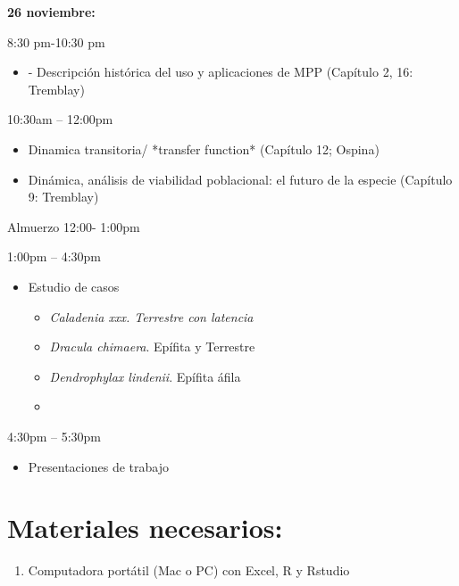 \documentclass[
]{book}
\providecommand{\tightlist}{%
  \setlength{\itemsep}{0pt}\setlength{\parskip}{0pt}}
\theoremstyle{definition}
\theoremstyle{definition}
\theoremstyle{definition}
\theoremstyle{definition}
\theoremstyle{remark}
\begin{document}
\textbf{26 noviembre:}

8:30 pm-10:30 pm

\begin{itemize}
\tightlist
\item
  - Descripción histórica del uso y aplicaciones de MPP (Capítulo 2,
  16: Tremblay)
\end{itemize}

10:30am -- 12:00pm

\begin{itemize}
\item
  Dinamica transitoria/ *transfer function* (Capítulo 12; Ospina)
\item
  Dinámica, análisis de viabilidad poblacional: el futuro de la
  especie (Capítulo 9: Tremblay)
\end{itemize}

Almuerzo 12:00- 1:00pm

1:00pm -- 4:30pm

\begin{itemize}
\tightlist
\item
  Estudio de casos

  \begin{itemize}
  \tightlist
  \item
    \emph{Caladenia xxx. Terrestre con latencia}
  \item
    \emph{Dracula chimaera}. Epífita y Terrestre
  \item
    \emph{Dendrophylax lindenii}. Epífita áfila
  \item
  \end{itemize}
\end{itemize}

4:30pm -- 5:30pm

\begin{itemize}
\tightlist
\item
  Presentaciones de trabajo
\end{itemize}

\hypertarget{materiales-necesarios}{%
\section{Materiales necesarios:}\label{materiales-necesarios}}

\begin{enumerate}
\def\labelenumi{\arabic{enumi}.}
\tightlist
\item
  Computadora portátil (Mac o PC) con Excel, R y Rstudio
\end{enumerate}
\end{document}
